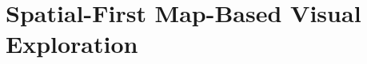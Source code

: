 \section{Spatial-First Map-Based Visual Exploration}\label{chap:4_1}

\graphicspath{{BigVis2018/}}





